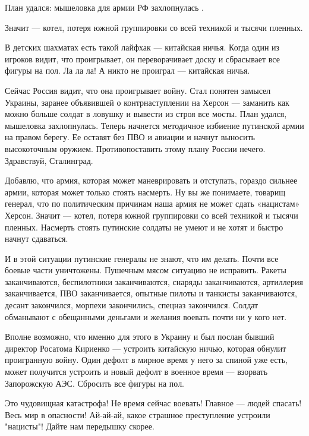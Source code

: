 {%
План удался: мышеловка для армии РФ захлопнулась .

Значит — котел, потеря южной группировки со всей техникой и тысячи пленных.

В детских шахматах есть такой лайфхак — китайская ничья. Когда один из игроков
видит, что проигрывает, он переворачивает доску и сбрасывает все фигуры на пол.
Ла ла ла! А никто не проиграл — китайская ничья.

Сейчас Россия видит, что она проигрывает войну. Стал понятен замысел Украины,
заранее объявившей о контрнаступлении на Херсон — заманить как можно больше
солдат в ловушку и вывести из строя все мосты. План удался, мышеловка
захлопнулась. Теперь начнется методичное избиение путинской армии на правом
берегу. Ее оставят без ПВО и авиации и начнут выносить высокоточным оружием.
Противопоставить этому плану России нечего. Здравствуй, Сталинград.

Добавлю, что армия, которая может маневрировать и отступать, гораздо сильнее
армии, которая может только стоять насмерть. Ну вы же понимаете, товарищ
генерал, что по политическим причинам наша армия не может сдать «нацистам»
Херсон. Значит — котел, потеря южной группировки со всей техникой и тысячи
пленных. Насмерть стоять путинские солдаты не умеют и не хотят и быстро начнут
сдаваться.

И в этой ситуации путинские генералы не знают, что им делать. Почти все боевые
части уничтожены. Пушечным мясом ситуацию не исправить. Ракеты заканчиваются,
беспилотники заканчиваются, снаряды заканчиваются, артиллерия заканчивается,
ПВО заканчивается, опытные пилоты и танкисты заканчиваются, десант закончился,
морпехи закончились, спецназ закончился. Солдат обманывают с обещанными
деньгами и желания воевать почти ни у кого нет.

Вполне возможно, что именно для этого в Украину и был послан бывший директор
Росатома Кириенко — устроить китайскую ничью, которая обнулит проигранную
войну. Один дефолт в мирное время у него за спиной уже есть, может получится
устроить и новый дефолт в военное время — взорвать Запорожскую АЭС. Сбросить
все фигуры на пол.

Это чудовищная катастрофа! Не время сейчас воевать! Главное — людей спасать!
Весь мир в опасности! Ай-ай-ай, какое страшное преступление устроили "нацисты"!
Дайте нам передышку скорее. 


}
